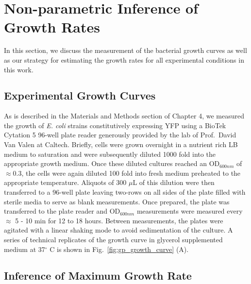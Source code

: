 \documentclass[12pt]{caltech_thesis}
\begin{document}
\hypertarget{non-parametric-inference-of-growth-rates}{%
\section{Non-parametric Inference of Growth
Rates}\label{non-parametric-inference-of-growth-rates}}

In this section, we discuss the measurement of the bacterial growth
curves as well as our strategy for estimating the growth rates for all
experimental conditions in this work.

\hypertarget{experimental-growth-curves}{%
\subsection{Experimental Growth
Curves}\label{experimental-growth-curves}}

As is described in the Materials and Methods section of Chapter 4, we
measured the growth of \emph{E. coli} strains constitutively expressing
YFP using a BioTek Cytation 5 96-well plate reader generously provided
by the lab of Prof.~David Van Valen at Caltech. Briefly, cells were
grown overnight in a nutrient rich LB medium to saturation and were
subsequently diluted 1000 fold into the appropriate growth medium. Once
these diluted cultures reached an OD\(_{600nm}\) of \(\approx 0.3\), the
cells were again diluted 100 fold into fresh medium preheated to the
appropriate temperature. Aliquots of 300 \(\mu\)L of this dilution were
then transferred to a 96-well plate leaving two-rows on all sides of the
plate filled with sterile media to serve as blank measurements. Once
prepared, the plate was transferred to the plate reader and
OD\(_{600nm}\) measurements were measured every \(\approx\) 5 - 10 min
for 12 to 18 hours. Between measurements, the plates were agitated with
a linear shaking mode to avoid sedimentation of the culture. A series of
technical replicates of the growth curve in glycerol supplemented medium
at 37\(^\circ\) C is shown in Fig.~\ref{fig:gp_growth_curve} (A).

\hypertarget{inference-of-maximum-growth-rate}{%
\subsection{Inference of Maximum Growth
Rate}\label{inference-of-maximum-growth-rate}}
\end{document}
